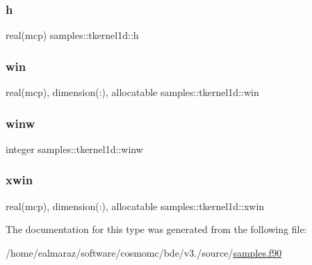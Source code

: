 \mbox{\label{structsamples_1_1tkernel1d_acd643b8bfceed479b68e8943d5cf8440}} 
\subsubsection{\texorpdfstring{h}{h}}
{\footnotesize\ttfamily real(mcp) samples\+::tkernel1d\+::h}

\mbox{\label{structsamples_1_1tkernel1d_a485144685b0c5beb822a70274f459c23}} 
\subsubsection{\texorpdfstring{win}{win}}
{\footnotesize\ttfamily real(mcp), dimension(\+:), allocatable samples\+::tkernel1d\+::win}

\mbox{\label{structsamples_1_1tkernel1d_a97f46a27282b7443e1836de699ab46c0}} 
\subsubsection{\texorpdfstring{winw}{winw}}
{\footnotesize\ttfamily integer samples\+::tkernel1d\+::winw}

\mbox{\label{structsamples_1_1tkernel1d_af3d5e04504dc1f17f0efd45dca9ba631}} 
\subsubsection{\texorpdfstring{xwin}{xwin}}
{\footnotesize\ttfamily real(mcp), dimension(\+:), allocatable samples\+::tkernel1d\+::xwin}



The documentation for this type was generated from the following file\+:\begin{DoxyCompactItemize}
\item 
/home/ealmaraz/software/cosmomc/bde/v3./source/\mbox{\hyperlink{samples_8f90}{samples.\+f90}}\end{DoxyCompactItemize}
